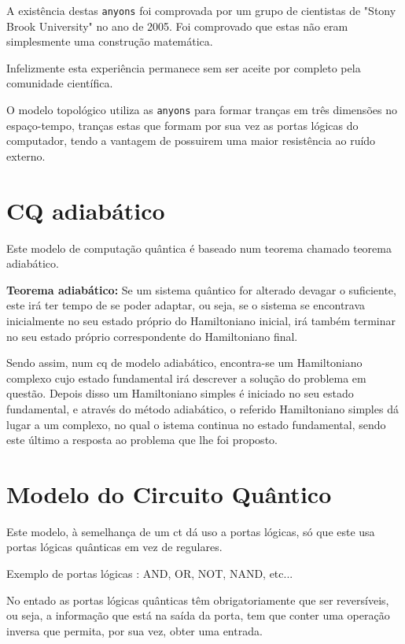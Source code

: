\documentclass{report}
\begin{document}
	A existência destas \verb|anyons| foi comprovada por um grupo de cientistas de "Stony Brook University" no ano de 2005. Foi comprovado que estas não eram simplesmente uma construção matemática.

	Infelizmente esta experiência permanece sem ser aceite por completo pela comunidade científica.

	O modelo topológico utiliza as \verb|anyons| para formar tranças em três dimensões no espaço-tempo, tranças estas que formam por sua vez as portas lógicas do computador, tendo a vantagem de possuirem uma maior resistência ao ruído externo.

\section{CQ adiabático}
\label{adiabático}

	Este modelo de computação quântica é baseado num teorema chamado teorema adiabático.

	\textbf{Teorema adiabático:} Se um sistema quântico for alterado devagar o suficiente, este irá ter tempo de se poder adaptar, ou seja, se o sistema se encontrava inicialmente no seu estado próprio do Hamiltoniano inicial, irá também terminar no seu estado próprio correspondente do Hamiltoniano final.

	Sendo assim, num \ac{cq} de modelo adiabático, encontra-se um Hamiltoniano complexo cujo estado fundamental irá descrever a solução do problema em questão. Depois disso um Hamiltoniano simples é iniciado no seu estado fundamental, e através do método adiabático, o referido Hamiltoniano simples dá lugar a um complexo, no qual o istema continua no estado fundamental, sendo este último a resposta ao problema que lhe foi proposto.

\section{Modelo do Circuito Quântico}

	Este modelo, à semelhança de um \ac{ct} dá uso a portas lógicas, só que este usa portas lógicas quânticas em vez de regulares.

	Exemplo de portas lógicas : AND, OR, NOT, NAND, etc...

	No entado as portas lógicas quânticas têm obrigatoriamente que ser reversíveis, ou seja, a informação que está na saída da porta, tem que conter uma operação inversa que permita, por sua vez, obter uma entrada.
\end{document}
